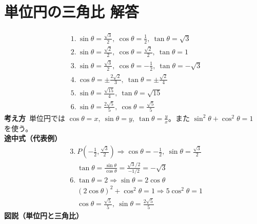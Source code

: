 \documentclass[paper=b4j,landscape,twocolumn,fleqn]{jlreq}
\begin{document}
\section{単位円の三角比 解答}
\begin{align*}
&1.\ \sin\theta=\frac{\sqrt3}{2},\ \cos\theta=\frac12,\ \tan\theta=\sqrt3\\[0.45em]
&2.\ \sin\theta=\frac{\sqrt2}{2},\ \cos\theta=\frac{\sqrt2}{2},\ \tan\theta=1\\[0.45em]
&3.\ \sin\theta=\frac{\sqrt3}{2},\ \cos\theta=-\frac12,\ \tan\theta=-\sqrt3\\[0.45em]
&4.\ \cos\theta=\pm\frac{2\sqrt2}{3},\ \tan\theta=\pm\frac{\sqrt2}{4}\\[0.45em]
&5.\ \sin\theta=\frac{\sqrt{15}}{4},\ \tan\theta=\sqrt{15}\\[0.45em]
&6.\ \sin\theta=\frac{2\sqrt5}{5},\ \cos\theta=\frac{\sqrt5}{5}
\end{align*}
\textbf{考え方}\
単位円では $\cos\theta=x,\ \sin\theta=y,\ \tan\theta=\frac{y}{x}$。また $\sin^2\theta+\cos^2\theta=1$ を使う。\\
\textbf{途中式（代表例）}
\begin{align*}
&3.\ P\left(-\frac12,\frac{\sqrt3}{2}\right)\Rightarrow \cos\theta=-\frac12,\ \sin\theta=\frac{\sqrt3}{2}\\
&\quad \tan\theta=\frac{\sin\theta}{\cos\theta}=\frac{\sqrt3/2}{-1/2}=-\sqrt3\\
&6.\ \tan\theta=2\Rightarrow \sin\theta=2\cos\theta\\
&\quad (2\cos\theta)^2+\cos^2\theta=1\Rightarrow 5\cos^2\theta=1\\
&\quad \cos\theta=\frac{\sqrt5}{5},\ \sin\theta=\frac{2\sqrt5}{5}
\end{align*}
\textbf{図説（単位円と三角比）}
\begin{center}
\end{center}

\newpage
\end{document}
